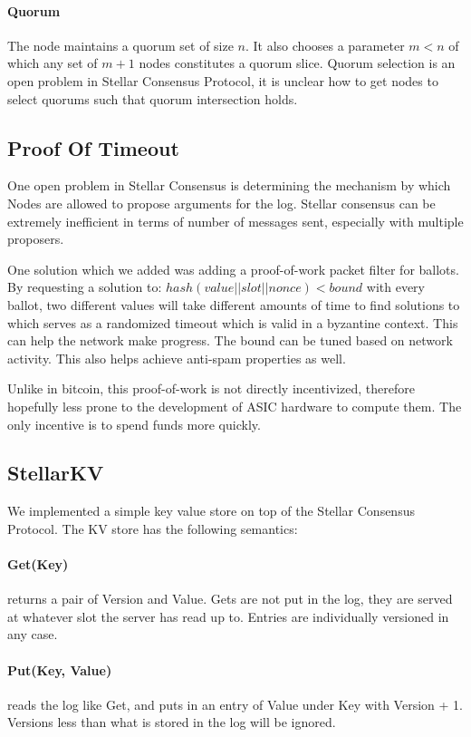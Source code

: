 \documentclass[preprint,11pt]{article} \usepackage{amsmath}
\begin{document}
\paragraph{Quorum}
The node maintains a quorum set of size $n$. It also chooses a
parameter $m < n$ of which any set of $m+1$ nodes constitutes a quorum
slice. Quorum selection is an open problem in Stellar Consensus
Protocol, it is unclear how to get nodes to select quorums such that
quorum intersection holds.

\subsection{Proof Of Timeout}
One open problem in Stellar Consensus is determining the mechanism by
which Nodes are allowed to propose arguments for the log. Stellar
consensus can be extremely inefficient in terms of number of messages
sent, especially with multiple proposers.

One solution which we added was adding a proof-of-work packet filter
for ballots. By requesting a solution to: $hash(value || slot ||
nonce) < bound$ with every ballot, two different values will take
different amounts of time to find solutions to which serves as a
randomized timeout which is valid in a byzantine context. This can
help the network make progress. The bound can be tuned based on
network activity. This also helps achieve anti-spam properties as
well.

Unlike in bitcoin, this proof-of-work is not directly incentivized,
therefore hopefully less prone to the development of ASIC hardware to
compute them. The only incentive is to spend funds more quickly.

\subsection{StellarKV}
We implemented a simple key value store on top of the Stellar
Consensus Protocol. The KV store has the following semantics:

\paragraph{Get(Key)} returns a pair of Version and Value. Gets are not put in the log, they are served
at whatever slot the server has read up to. Entries are individually
versioned in any case.
\paragraph{Put(Key, Value)}  reads the log like Get, and puts in an entry of Value under Key with Version + 1. Versions less than what is stored in the log will be ignored.
\end{document}
